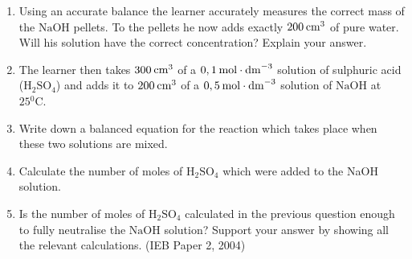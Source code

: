 \begin{enumerate}[noitemsep, label=\textbf{\arabic*}. ]
\begin{enumerate}[noitemsep, label=\textbf{\alph*}. ]
\label{m38712*uid157}\item Using an accurate balance the learner accurately measures the correct mass of the \begin{math}\mathrm{NaOH}\end{math} pellets. To the pellets he now adds exactly \begin{math}200\phantom{\rule{2pt}{0ex}}{\mathrm{cm}}^{3}\end{math} of pure water. Will his solution have the correct concentration? Explain your answer.\item The learner then takes \begin{math}300\phantom{\rule{2pt}{0ex}}{\mathrm{cm}}^{3}\end{math} of a \begin{math}0,1\phantom{\rule{2pt}{0ex}}\mathrm{mol}\ensuremath{\cdot}{\mathrm{dm}}^{-3}\end{math} solution of sulphuric acid (\begin{math}\mathrm{H}{}_{2}\mathrm{SO}{}_{4}\end{math}) and adds it to \begin{math}200\phantom{\rule{2pt}{0ex}}{\mathrm{cm}}^{3}\end{math} of a \begin{math}0,5\phantom{\rule{2pt}{0ex}}\mathrm{mol}\ensuremath{\cdot}{\mathrm{dm}}^{-3}\end{math} solution of \begin{math}\mathrm{NaOH}\end{math} at \begin{math}25{}^{0}\mathrm{C}\end{math}.
\label{m38712*uid158}\item Write down a balanced equation for the reaction which takes place when these two solutions are mixed.
\label{m38712*uid159}\item Calculate the number of moles of \begin{math}\mathrm{H}{}_{2}\mathrm{SO}{}_{4}\end{math} which were added to the NaOH solution.
\label{m38712*uid160}\item Is the number of moles of \begin{math}\mathrm{H}{}_{2}\mathrm{SO}{}_{4}\end{math} calculated in the previous question enough to fully neutralise the \begin{math}\mathrm{NaOH}\end{math} solution? Support your answer by showing all the relevant calculations.
(IEB Paper 2, 2004)
\end{enumerate}
                \end{enumerate}
        
